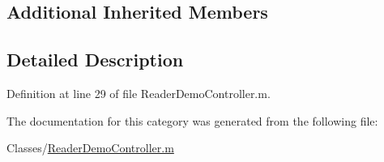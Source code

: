\subsection*{Additional Inherited Members}


\subsection{Detailed Description}


Definition at line 29 of file Reader\-Demo\-Controller.\-m.



The documentation for this category was generated from the following file\-:\begin{DoxyCompactItemize}
\item 
Classes/\hyperlink{_reader_demo_controller_8m}{Reader\-Demo\-Controller.\-m}\end{DoxyCompactItemize}
